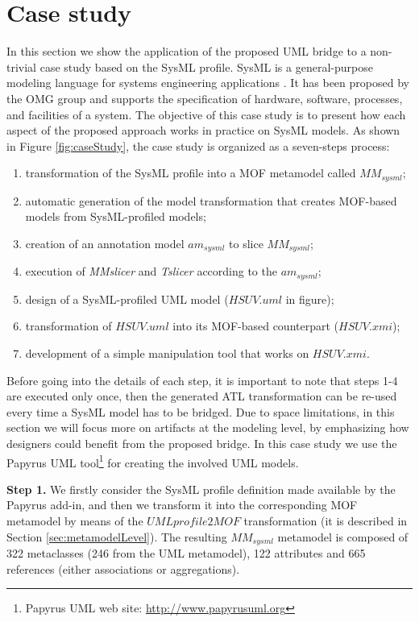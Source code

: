 \section{Case study}\label{sec:caseStudy}
In this section we show the application of the proposed UML bridge to a non-trivial case study based on the SysML profile.
SysML is a general-purpose modeling language for systems engineering applications \cite{sysml}. It has been proposed by the OMG group
and supports the specification of  hardware, software, processes, and facilities of a system.
The objective of this case study is to present how each aspect of the proposed approach works in practice on SysML models.
As shown in Figure \ref{fig:caseStudy}, the case study is organized as a seven-steps process:
%
\begin{enumerate}
	\item transformation of the SysML profile into a MOF metamodel called $MM_{sysml}$;
	\item automatic generation of the model transformation that creates MOF-based models from SysML-profiled models;
	\item creation of an annotation model $am_{sysml}$ to slice $MM_{sysml}$;
	\item execution of \textit{MMslicer} and \textit{Tslicer} according to the $am_{sysml}$;
	\item design of a SysML-profiled UML model ($HSUV.uml$ in figure);
	\item transformation of $HSUV.uml$ into its MOF-based counterpart ($HSUV.xmi$);
	\item development of a simple manipulation tool that works on $HSUV.xmi$.
\end{enumerate}
%
Before going into the details of each step, it is important to note that steps 1-4 are executed only once,
then the generated ATL transformation can be re-used every time a SysML model has to be bridged.
Due to space limitations, in this section we will focus more on artifacts at the modeling level, by emphasizing
how designers could benefit from the proposed bridge.
In this case study we use the Papyrus UML tool\footnote{Papyrus UML web site: \small{\url{http://www.papyrusuml.org}}} for
creating the involved UML models.

\textbf{Step 1.} We firstly consider the SysML profile definition made available by the Papyrus add-in,
and then we transform it into the corresponding MOF metamodel
by means of the $UMLprofile2MOF$ transformation (it is described in Section \ref{sec:metamodelLevel}).
The resulting $MM_{sysml}$ metamodel is composed of 322 metaclasses (246 from the UML metamodel),
122 attributes and 665 references (either associations or aggregations).

